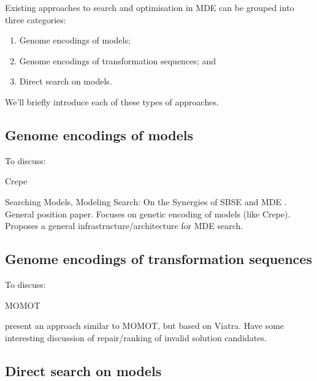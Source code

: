   Existing approaches to search and optimisation in MDE can be grouped into three categories:
	\begin{enumerate}
		\item Genome encodings of models; 
		\item Genome encodings of transformation sequences; and
		\item Direct search on models.
	\end{enumerate}
	 We'll briefly introduce each of these types of approaches.
	
	\subsection{Genome encodings of models}
	
	  \begin{draftlist}
		  To discuss:
  		\item Crepe \cite{Efstathiou+14b,Williams13}
	  	\item Searching Models, Modeling Search: On the Synergies of SBSE and MDE \cite{Kessentini+13}. General position paper. Focuses on genetic encoding of models 
		        (like Crepe). Proposes a general infrastructure/architecture for MDE search.
  	\end{draftlist}
	
	\subsection{Genome encodings of transformation sequences}

		\begin{draftlist}
			To discuss:
			\item MOMOT \cite{Fleck15}					
			\item \cite{Abdeen+14} present an approach similar to MOMOT, but based on Viatra. Have some interesting discussion of repair/ranking of invalid solution
						candidates.
		\end{draftlist}

	\subsection{Direct search on models}
	
